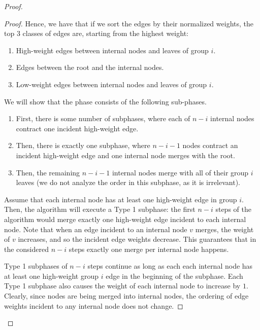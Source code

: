 \documentclass[11pt]{article}
\begin{document}
\begin{proof}
\begin{proof}
Hence, we have that if we sort the edges by their normalized weights, the top 3 classes of edges are, starting from the highest weight:
\begin{enumerate}
    \item High-weight edges between internal nodes and leaves of group $i$.
    \item Edges between the root and the internal nodes.
    \item Low-weight edges between internal nodes and leaves of group $i$.
\end{enumerate}

\noindent We will show that the phase consists of the following sub-phases.
\begin{enumerate}
\item First, there is some number of subphases, where each of $n-i$ internal nodes contract one incident high-weight edge.
\item Then, there is exactly one subphase, where $n-i-1$ nodes contract an incident high-weight edge and one internal node merges with the root.
\item Then, the remaining $n-i-1$ internal nodes merge with all of their group $i$ leaves (we do not analyze the order in this subphase, as it is irrelevant).
\end{enumerate}

Assume that each internal node has at least one high-weight edge in group $i$.
Then, the algorithm will execute a Type 1 subphase: the first $n-i$ steps of the algorithm would merge exactly one high-weight edge incident to each internal node.
Note that when an edge incident to an internal node $v$ merges, the weight of $v$ increases, and so the incident edge weights decrease.
This guarantees that in the considered $n-i$ steps exactly one merge per internal node happens.

Type 1 subphases of $n-i$ steps continue as long as each each internal node has at least one high-weight group $i$ edge in the beginning of the subphase.
Each Type 1 subphase also causes the weight of each internal node to increase by $1$.
Clearly, since nodes are being merged into internal nodes, the ordering of edge weights incident to any internal node does not change.


\end{proof}
\end{proof}
\end{document}
